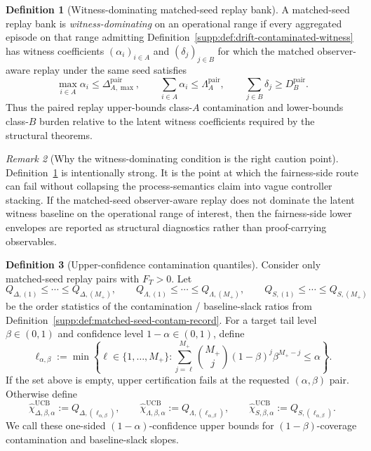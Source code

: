 \documentclass[11pt]{article}
\newcommand{\1}{\mathbf{1}}
\theoremstyle{definition}
\newtheorem{definition}{Definition}[section]
\theoremstyle{plain}
\theoremstyle{remark}
\newtheorem{remark}[definition]{Remark}
\begin{document}
\begin{definition}[Witness-dominating matched-seed replay bank]
\label{supp:def:witness-dominating-bank}
A matched-seed replay bank is \emph{witness-dominating} on an operational range if every aggregated episode on that range admitting Definition~\ref{supp:def:drift-contaminated-witness} has witness coefficients $(\alpha_i)_{i\in A}$ and $(\delta_j)_{j\in B}$ for which the matched observer-aware replay under the same seed satisfies
\[
\max_{i\in A}\alpha_i \le \Delta_{A,\max}^{\mathrm{pair}},
\qquad
\sum_{i\in A}\alpha_i \le \Lambda_A^{\mathrm{pair}},
\qquad
\sum_{j\in B}\delta_j \ge D_B^{\mathrm{pair}}.
\]
Thus the paired replay upper-bounds class-$A$ contamination and lower-bounds class-$B$ burden relative to the latent witness coefficients required by the structural theorems.
\end{definition}

\begin{remark}[Why the witness-dominating condition is the right caution point]
\label{supp:rem:witness-dominating-caution}
Definition~\ref{supp:def:witness-dominating-bank} is intentionally strong. It is the point at which the fairness-side route can fail without collapsing the process-semantics claim into vague controller stacking. If the matched-seed observer-aware replay does not dominate the latent witness baseline on the operational range of interest, then the fairness-side lower envelopes are reported as structural diagnostics rather than proof-carrying observables.
\end{remark}

\begin{definition}[Upper-confidence contamination quantiles]
\label{supp:def:ucb-contam}
Consider only matched-seed replay pairs with $F_T>0$. Let
\[
Q_{\Delta,(1)}\le \cdots \le Q_{\Delta,(M_+)},
\qquad
Q_{\Lambda,(1)}\le \cdots \le Q_{\Lambda,(M_+)},
\qquad
Q_{S,(1)}\le \cdots \le Q_{S,(M_+)}
\]
be the order statistics of the contamination / baseline-slack ratios from Definition~\ref{supp:def:matched-seed-contam-record}. For a target tail level $\beta\in(0,1)$ and confidence level $1-\alpha\in(0,1)$, define
\[
\ell_{\alpha,\beta}
:=
\min\left\{
 \ell\in\{1,\dots,M_+\}:
 \sum_{j=\ell}^{M_+}\binom{M_+}{j}(1-\beta)^j\beta^{M_+-j}\le \alpha
\right\}.
\]
If the set above is empty, upper certification fails at the requested $(\alpha,\beta)$ pair. Otherwise define
\[
\widehat\chi_{\Delta,\beta,\alpha}^{\mathrm{UCB}} := Q_{\Delta,(\ell_{\alpha,\beta})},
\qquad
\widehat\chi_{\Lambda,\beta,\alpha}^{\mathrm{UCB}} := Q_{\Lambda,(\ell_{\alpha,\beta})},
\qquad
\widehat\chi_{S,\beta,\alpha}^{\mathrm{UCB}} := Q_{S,(\ell_{\alpha,\beta})}.
\]
We call these one-sided $(1-\alpha)$-confidence upper bounds for $(1-\beta)$-coverage contamination and baseline-slack slopes.
\end{definition}
\end{document}
